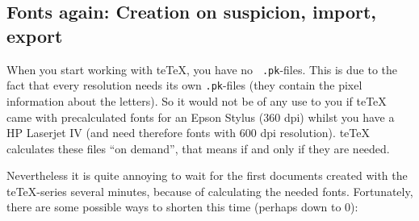 \documentclass[12pt,a4paper]{article}
\newcommand{\teTeX}{\textrm{te}\TeX\xspace}
\begin{document}







\subsection{Fonts again: Creation on suspicion, import, export}
\label{ssec:fon}

When you start working with \teTeX{}, you have no {\tt
  .pk}-files.  This is due to the fact that every
resolution needs its own {\tt .pk}-files (they contain the
pixel information about the letters).  So it would not be of
any use to you if \teTeX{} came with precalculated fonts
for an Epson Stylus (360 dpi) whilst you have a HP Laserjet
IV (and need therefore fonts with 600 dpi resolution).
\teTeX{} calculates these files ``on demand'', that means if
and only if they are needed.

Nevertheless it is quite annoying to wait for the first
documents created with the \teTeX -series several minutes,
because of \MF{} calculating the needed fonts. Fortunately,
there are some possible ways to shorten this time (perhaps
down to 0):
\end{document}
